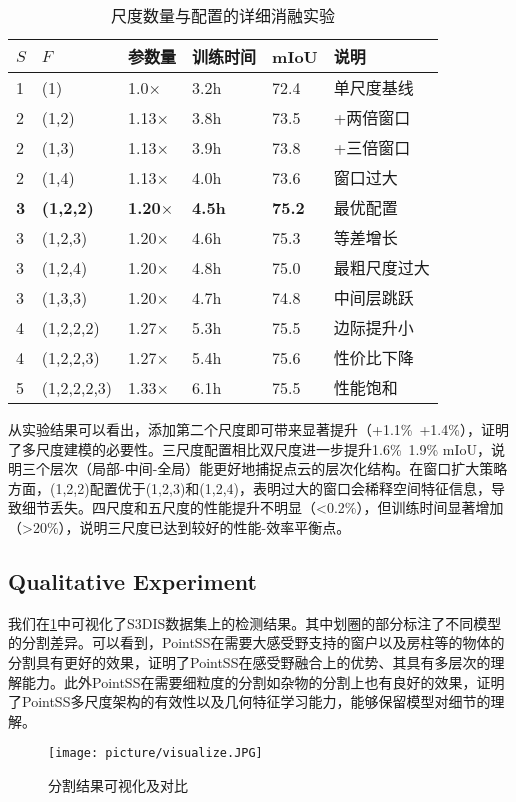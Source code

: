 \documentclass[preprint,12pt]{elsarticle}
\begin{document}
\begin{table}[htbp!]
	\centering
	\caption{尺度数量与配置的详细消融实验}
	\label{tab:scale_number}
	\begin{tabular}{@{}llllll@{}}
		\toprule
		$S$ & $F$ & 参数量 & 训练时间 & mIoU & 说明 \\ 
		\midrule
		1 & (1) & 1.0$\times$ & 3.2h & 72.4 & 单尺度基线 \\
		\midrule
		2 & (1,2) & 1.13$\times$ & 3.8h & 73.5 & +两倍窗口 \\
		2 & (1,3) & 1.13$\times$ & 3.9h & 73.8 & +三倍窗口 \\
		2 & (1,4) & 1.13$\times$ & 4.0h & 73.6 & 窗口过大 \\
		\midrule
		\textbf{3} & \textbf{(1,2,2)} & \textbf{1.20$\times$} & \textbf{4.5h} & \textbf{75.2} & 最优配置 \\
		3 & (1,2,3) & 1.20$\times$ & 4.6h & 75.3 & 等差增长 \\
		3 & (1,2,4) & 1.20$\times$ & 4.8h & 75.0 & 最粗尺度过大 \\
		3 & (1,3,3) & 1.20$\times$ & 4.7h & 74.8 & 中间层跳跃 \\
		\midrule
		4 & (1,2,2,2) & 1.27$\times$ & 5.3h & 75.5 & 边际提升小 \\
		4 & (1,2,2,3) & 1.27$\times$ & 5.4h & 75.6 & 性价比下降 \\
		5 & (1,2,2,2,3) & 1.33$\times$ & 6.1h & 75.5 & 性能饱和 \\
		\bottomrule
	\end{tabular}
\end{table}

从实验结果可以看出，添加第二个尺度即可带来显著提升（+1.1\%~+1.4\%），证明了多尺度建模的必要性。三尺度配置相比双尺度进一步提升1.6\%~1.9\% mIoU，说明三个层次（局部-中间-全局）能更好地捕捉点云的层次化结构。在窗口扩大策略方面，(1,2,2)配置优于(1,2,3)和(1,2,4)，表明过大的窗口会稀释空间特征信息，导致细节丢失。四尺度和五尺度的性能提升不明显（<0.2\%），但训练时间显著增加（>20\%），说明三尺度已达到较好的性能-效率平衡点。



\subsection{Qualitative Experiment}
我们在\cref{fig:vis}中可视化了S3DIS数据集上的检测结果。其中划圈的部分标注了不同模型的分割差异。可以看到，PointSS在需要大感受野支持的窗户以及房柱等的物体的分割具有更好的效果，证明了PointSS在感受野融合上的优势、其具有多层次的理解能力。此外PointSS在需要细粒度的分割如杂物的分割上也有良好的效果，证明了PointSS多尺度架构的有效性以及几何特征学习能力，能够保留模型对细节的理解。
\begin{figure}[htbp]
	\centering
	\texttt{[image: picture/visualize.JPG]}
	\caption{分割结果可视化及对比}
	\label{fig:vis}
\end{figure}
\end{document}
